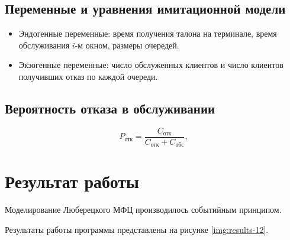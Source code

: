 \documentclass[a4paper,oneside,12pt]{extreport}
\begin{document}
\section{Переменные и уравнения имитационной модели}

\begin{itemize}
	\item Эндогенные переменные: время получения талона на терминале, время обслуживания $i$-м окном, размеры очередей.
	\item Экзогенные переменные: число обслуженных клиентов и число клиентов получивших отказ по каждой очереди.
\end{itemize}

\section{Вероятность отказа в обслуживании}

\begin{equation}
	P_{\text{отк}} = \frac{C_{\text{отк}}}{C_{\text{отк}} + C_{\text{обс}}},
\end{equation}


\chapter{Результат работы}

Моделирование Люберецкого МФЦ производилось событийным принципом.

Результаты работы программы представлены на рисунке \ref{img:results-12}.
\end{document}
